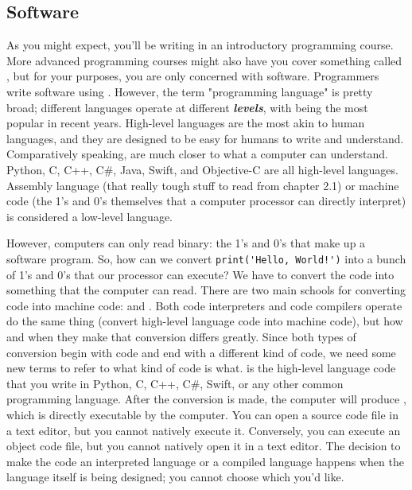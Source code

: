 \subsection{Software}
As you might expect, you'll be writing  in an introductory programming course. More advanced programming courses might also have you cover something called , but for your purposes, you are only concerned with software. Programmers write software using . However, the term "programming language" is pretty broad; different languages operate at different \textbf{\textit{levels}}, with  being the most popular in recent years. High-level languages are the most akin to human languages, and they are designed to be easy for humans to write and understand. Comparatively speaking,  are much closer to what a computer can understand. Python, C, C++, C\#, Java, Swift, and Objective-C are all high-level languages. Assembly language (that really tough stuff to read from chapter 2.1) or machine code (the 1's and 0's themselves that a computer processor can directly interpret) is considered a low-level language.\par
However, computers can only read binary: the 1's and 0's that make up a software program. So, how can we convert \verb|print('Hello, World!')| into a bunch of 1's and 0's that our processor can execute? We have to convert the code into something that the computer can read. There are two main schools for converting code into machine code:  and . Both code interpreters and code compilers operate do the same thing (convert high-level language code into machine code), but how and when they make that conversion differs greatly. Since both types of conversion begin with code and end with a different kind of code, we need some new terms to refer to what kind of code is what.  is the high-level language code that you write in Python, C, C++, C\#, Swift, or any other common programming language. After the conversion is made, the computer will produce , which is directly executable by the computer. You can open a source code file in a text editor, but you cannot natively execute it. Conversely, you can execute an object code file, but you cannot natively open it in a text editor. The decision to make the code an interpreted language or a compiled language happens when the language itself is being designed; you cannot choose which you'd like.\par
